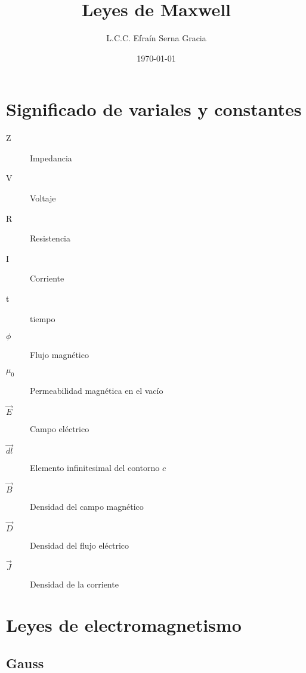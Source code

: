 \documentclass[12pt,spanish,lettersize]{article}
\title{\color{Maroon}Leyes de Maxwell}
\author{L.C.C. Efra\'in Serna Gracia}
\date{\color{gray}\today}
\begin{document}
\maketitle
\section{Significado de variales y constantes}
\begin{multicols}{4}
\begin{description}
\item[Z] Impedancia
\item[V] Voltaje
\item[R] Resistencia
\item[I] Corriente
\item[t] tiempo
\item[$\phi$] Flujo magn\'etico
\item[$\mu_{0}$] Permeabilidad magn\'etica en el vac\'io
\item[$\overrightarrow{E}$] Campo el\'ectrico
\item[$\overrightarrow{dl}$] Elemento infinitesimal del contorno $c$
\item[$\overrightarrow{B}$] Densidad del campo magn\'etico
\item[$\overrightarrow{D}$] Densidad del flujo el\'ectrico
\item[$\overrightarrow{J}$] Densidad de la corriente
\end{description}
\end{multicols}

\section{Leyes de electromagnetismo}

\subsection{Gauss}
\end{document}
